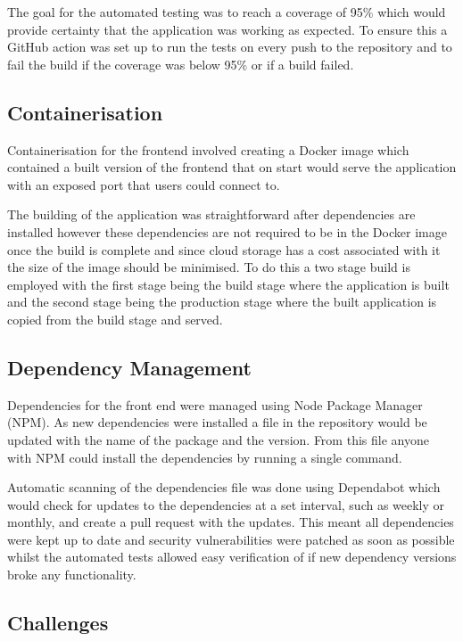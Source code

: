 The goal for the automated testing was to reach a coverage of 95\% which would provide certainty that the application was working as expected. To ensure this a GitHub action was set up to run the tests on every push to the repository and to fail the build if the coverage was below 95\% or if a build failed.

\subsection{Containerisation}
Containerisation for the frontend involved creating a Docker image which contained a built version of the frontend that on start would serve the application with an exposed port that users could connect to.

The building of the application was straightforward after dependencies are installed however these dependencies are not required to be in the Docker image once the build is complete and since cloud storage has a cost associated with it the size of the image should be minimised. To do this a two stage build is employed with the first stage being the build stage where the application is built and the second stage being the production stage where the built application is copied from the build stage and served.

\subsection{Dependency Management}
Dependencies for the front end were managed using Node Package Manager (NPM). As new dependencies were installed a file in the repository would be updated with the name of the package and the version. From this file anyone with NPM could install the dependencies by running a single command.

Automatic scanning of the dependencies file was done using Dependabot which would check for updates to the dependencies at a set interval, such as weekly or monthly, and create a pull request with the updates. This meant all dependencies were kept up to date and security vulnerabilities were patched as soon as possible whilst the automated tests allowed easy verification of if new dependency versions broke any functionality.

\subsection{Challenges}
